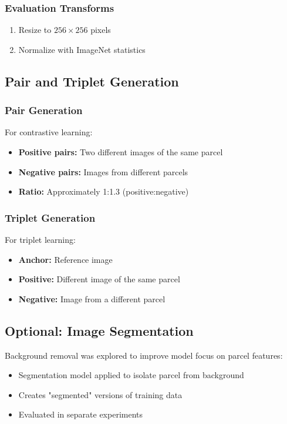 \documentclass[12pt,a4paper]{article}
\begin{document}
\subsubsection{Evaluation Transforms}

\begin{enumerate}
    \item Resize to $256 \times 256$ pixels
    \item Normalize with ImageNet statistics
\end{enumerate}

\subsection{Pair and Triplet Generation}

\subsubsection{Pair Generation}

For contrastive learning:
\begin{itemize}
    \item \textbf{Positive pairs:} Two different images of the same parcel
    \item \textbf{Negative pairs:} Images from different parcels
    \item \textbf{Ratio:} Approximately 1:1.3 (positive:negative)
\end{itemize}

\subsubsection{Triplet Generation}

For triplet learning:
\begin{itemize}
    \item \textbf{Anchor:} Reference image
    \item \textbf{Positive:} Different image of the same parcel
    \item \textbf{Negative:} Image from a different parcel
\end{itemize}

\subsection{Optional: Image Segmentation}

Background removal was explored to improve model focus on parcel features:

\begin{itemize}
    \item Segmentation model applied to isolate parcel from background
    \item Creates "segmented" versions of training data
    \item Evaluated in separate experiments
\end{itemize}
\end{document}
